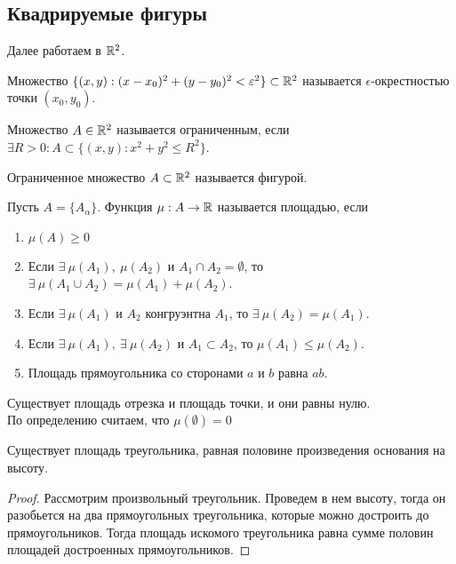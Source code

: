 \subsection{Квадрируемые фигуры}
Далее работаем в $\mathbb{R}^2$.
\begin{definition}
    Множество $\{(x,y): (x-x_0)^2+(y-y_0)^2<\varepsilon^2\}\subset \mathbb{R}^2$ называется $\epsilon$-окрестностью точки $(x_0,y_0)$.
\end{definition}
\begin{definition}
    Множество $A\in \mathbb{R}^2$ называется ограниченным, если $\exists R>0: A\subset \{(x,y): x^2+y^2\leq R^2\}$.
\end{definition}  
\begin{definition}
    Ограниченное множество $A\subset \mathbb{R}^2$ называется фигурой.
\end{definition} 
\begin{definition}
    Пусть $A=\{A_{\alpha}\}$. Функция $\mu: A\to \mathbb{R}$ называется площадью, если 
    \begin{enumerate}
        \item $\mu(A)\geq 0$
        \item Если $\exists\ \mu(A_1),\ \mu(A_2)$ и $A_1\cap A_2 =\emptyset$, то $\exists\ \mu(A_1 \cup A_2)=\mu(A_1)+\mu(A_2)$.
        \item Если $\exists\ \mu(A_1)$ и $A_2$ конгруэнтна $A_1$, то $\exists\ \mu(A_2)=\mu(A_1)$.
        \item Если $\exists\ \mu(A_1),\ \exists\ \mu(A_2)$ и $A_1\subset A_2$, то $\mu(A_1)\leq \mu(A_2)$.
        \item Площадь прямоугольника со сторонами $a$ и $b$ равна $ab$.
    \end{enumerate}
\end{definition} 
\begin{comm}
    Существует площадь отрезка и площадь точки, и они равны нулю.\\
    По определению считаем, что $\mu(\emptyset)=0$
\end{comm} 
\begin{statement}
    Существует площадь треугольника, равная половине произведения основания на высоту.
\end{statement} 
\begin{proof}
    Рассмотрим произвольный треугольник. Проведем в нем высоту, тогда он разобьется на два прямоугольных треугольника, которые можно достроить до прямоугольников. Тогда площадь искомого треугольника равна сумме половин площадей достроенных прямоугольников. 
\end{proof} 
